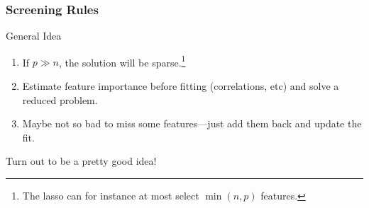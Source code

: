 \documentclass[10pt]{beamer}
\begin{document}
\begin{frame}[c]
  \frametitle{Screening Rules}

  \begin{block}{General Idea}
    \begin{enumerate}
      \item If \(p \gg n\), the solution will be sparse.\footnote{The lasso can for instance at most
              select \(\min(n, p)\) features.}
      \item Estimate feature importance before fitting (correlations, etc) and solve a reduced problem.
      \item Maybe not so bad to miss some features---just add them back and update the fit.
    \end{enumerate}

    \medskip\pause

    Turn out to be a pretty good idea!
  \end{block}
\end{frame}
\end{document}

